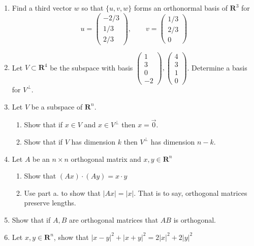 \documentclass[12pt]{article}
\numberwithin{equation}{subsection}
\numberwithin{figure}{subsection}
\theoremstyle{note}
\newcommand{\R}{\mathbf{R}}
\newcommand\m[1]{\begin{pmatrix}#1\end{pmatrix}}
\begin{document}
\begin{enumerate}[label=\arabic*.]
\begin{enumerate}
\end{enumerate}



\item Find a third vector $w$ so that $\{u,v,w\}$ forms an orthonormal basis of $\R^3$ for \[u=\begin{pmatrix} -2/3 \\ 1/3\\2/3\end{pmatrix}, \qquad v=\m{ 1/3 \\ 2/3\\ 0}\]
\item Let $V\subset \R^4$ be the subspace with basis $\begin{pmatrix} 1 \\ 3 \\ 0 \\ -2\end{pmatrix}, \begin{pmatrix} 4 \\ 3\\ 1 \\ 0\end{pmatrix}$. Determine a basis for $V^{\perp}$.

\item Let $V$ be a subspace of $\R^n$. 
	\begin{enumerate}
		\item Show that if $x\in V$ and $x\in V^{\perp}$ then $x=\vec{0}$. 
		\item Show that if $V$ has dimension $k$ then $V^{\perp}$ has dimension $n-k$.
	\end{enumerate}
\item Let $A$ be an $n\times n$ orthogonal matrix and $x,y\in \R^n$
\begin{enumerate}
	\item Show that $(Ax)\cdot (Ay)=x\cdot y$
	\item Use part a. to show that $|Ax|=|x|$. That is to say, orthogonal matrices preserve lengths. 

\end{enumerate}

\item Show that if $A,B$ are orthogonal matrices that $AB$ is orthogonal. 

\item Let $x,y\in \R^n$, show that $|x-y|^2+|x+y|^2=2|x|^2+2|y|^2$




\end{enumerate}
\end{document}
